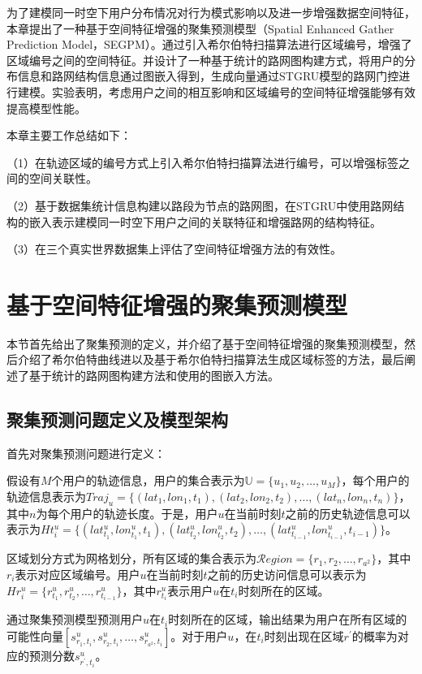 \documentclass[master]{thesis-uestc}
\begin{document}
为了建模同一时空下用户分布情况对行为模式影响以及进一步增强数据空间特征，本章提出了一种基于空间特征增强的聚集预测模型（Spatial Enhanced Gather Prediction Model，SEGPM）。通过引入希尔伯特扫描算法进行区域编号，增强了区域编号之间的空间特征。并设计了一种基于统计的路网图构建方式，将用户的分布信息和路网结构信息通过图嵌入得到，生成向量通过STGRU模型的路网门控进行建模。实验表明，考虑用户之间的相互影响和区域编号的空间特征增强能够有效提高模型性能。

本章主要工作总结如下：

（1）在轨迹区域的编号方式上引入希尔伯特扫描算法进行编号，可以增强标签之间的空间关联性。

（2）基于数据集统计信息构建以路段为节点的路网图，在STGRU中使用路网结构的嵌入表示建模同一时空下用户之间的关联特征和增强路网的结构特征。

（3）在三个真实世界数据集上评估了空间特征增强方法的有效性。

\section{基于空间特征增强的聚集预测模型}
本节首先给出了聚集预测的定义，并介绍了基于空间特征增强的聚集预测模型，然后介绍了希尔伯特曲线进以及基于希尔伯特扫描算法生成区域标签的方法，最后阐述了基于统计的路网图构建方法和使用的图嵌入方法。

\subsection{聚集预测问题定义及模型架构}
首先对聚集预测问题进行定义：

假设有$M$个用户的轨迹信息，用户的集合表示为$\mathbb{U}= \{u_1,u_2,\dots, u_M\}$，每个用户的轨迹信息表示为$Traj_u = \{(lat_1,lon_1,t_1), (lat_2,lon_2,t_2), \dots, (lat_n,lon_n,t_n)\}$，其中$n$为每个用户的轨迹长度。于是，用户$u$在当前时刻$t$之前的历史轨迹信息可以表示为$Ht_i^u = \{(lat_{t_1}^u,lon_{t_1}^u,t_1),(lat_{t_2}^u,lon_{t_2}^u,t_2), \dots, (lat_{t_{i-1}}^u,lon_{t_{i-1}}^u,t_{i-1})\}$。

区域划分方式为网格划分，所有区域的集合表示为$\mathcal{R}egion=\{r_1,r_2,\dots, r_{a^2}\}$，其中$r_i$表示对应区域编号。用户$u$在当前时刻$t$之前的历史访问信息可以表示为$Hr_i^u = \{r_{t_1}^u, r_{t_2}^u, \dots, r_{t_{i-1}}^u\}$，其中$r_{t_i}^u$表示用户$u$在$t_i$时刻所在的区域。

通过聚集预测模型预测用户$u$在$t_i$时刻所在的区域，输出结果为用户在所有区域的可能性向量$[s^u_{r_1,t_i},s^u_{r_2,t_i},\dots,s^u_{r_{a^2},t_i}]$。对于用户$u$，在$t_i$时刻出现在区域$r^{\prime}$的概率为对应的预测分数$s^u_{r^{\prime},t_i}$。
\end{document}

